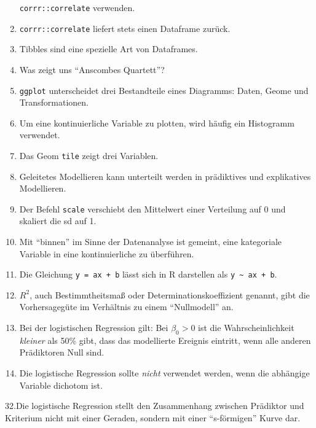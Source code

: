 \documentclass[12pt,ngerman,]{book}
\theoremstyle{definition}
\theoremstyle{definition}
\theoremstyle{remark}
\begin{document}
\begin{enumerate}
  \texttt{corrr::correlate} verwenden.
\item
  \texttt{corrr::correlate} liefert stets einen Dataframe zurück.
\item
  Tibbles sind eine spezielle Art von Dataframes.
\item
  Was zeigt uns ``Anscombes Quartett''?
\item
  \texttt{ggplot} unterscheidet drei Bestandteile eines Diagramms:
  Daten, Geome und Transformationen.
\item
  Um eine kontinuierliche Variable zu plotten, wird häufig ein
  Histogramm verwendet.
\item
  Das Geom \texttt{tile} zeigt drei Variablen.
\item
  Geleitetes Modellieren kann unterteilt werden in prädiktives und
  explikatives Modellieren.
\item
  Der Befehl \texttt{scale} verschiebt den Mittelwert einer Verteilung
  auf 0 und skaliert die sd auf 1.
\item
  Mit ``binnen'' im Sinne der Datenanalyse ist gemeint, eine kategoriale
  Variable in eine kontinuierliche zu überführen.
\item
  Die Gleichung \texttt{y\ =\ ax\ +\ b} lässt sich in R darstellen als
  \texttt{y\ \textasciitilde{}\ ax\ +\ b}.
\item
  \(R^2\), auch Bestimmtheitsmaß oder Determinationskoeffizient genannt,
  gibt die Vorhersagegüte im Verhältnis zu einem ``Nullmodell'' an.
\item
  Bei der logistischen Regression gilt: Bei \(\beta_0>0\) ist die
  Wahrscheinlichkeit \emph{kleiner} als 50\% gibt, dass das modellierte
  Ereignis eintritt, wenn alle anderen Prädiktoren Null sind.
\item
  Die logistische Regression sollte \emph{nicht} verwendet werden, wenn
  die abhängige Variable dichotom ist.
\end{enumerate}

32.Die logistische Regression stellt den Zusammenhang zwischen Prädiktor
und Kriterium nicht mit einer Geraden, sondern mit einer ``s-förmigen''
Kurve dar.
\end{document}
